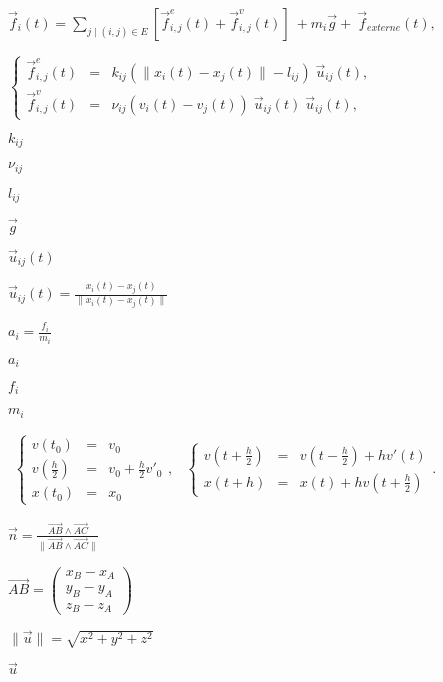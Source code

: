 \documentclass{article}
\begin{document}
$ \vec{f}_i(t) = \sum_{j\mid(i,j)\in E} \left[\vec{f}^{e}_{i,j}(t) + \vec{f}^{v}_{i,j}(t) \right] \: + m_i \vec{g} +\: \vec{f}_{externe}(t),$
\pagebreak

$ \left\{ \begin{array}{lcl} \vec{f}^{e}_{i,j}(t) &=& k_{ij} \left(\|x_i(t) - x_j(t)\| - l_{ij}\right)\; \vec{u}_{ij}(t),\\ \vec{f}^{v}_{i,j}(t) &=& {\nu}_{ij} \left(v_i(t) - v_j(t)\right) \; \vec{u}_{ij}(t) \; \vec{u}_{ij}(t), \end{array} \right. $
\pagebreak

$k_{ij}$
\pagebreak

${\nu}_{ij}$
\pagebreak

$l_{ij}$
\pagebreak

$\vec{g}$
\pagebreak

$\vec{u}_{ij}(t)$
\pagebreak

$ \vec{u}_{ij}(t) = \frac{x_i(t) - x_j(t)}{\|x_i(t) - x_j(t)\|} $
\pagebreak

$ a_i = \frac{f_i}{m_i} $
\pagebreak

$a_i$
\pagebreak

$f_i $
\pagebreak

$m_i $
\pagebreak

$ \begin{array}{lr} \left\{ \begin{array}{ccl} v(t_0) &=& v_0\\ v(\frac{h}{2}) &=& v_0 + \frac{h}{2}v'_0\\ x(t_0) &=& x_0 \end{array} \right., & \left\{ \begin{array}{ccl} v(t+\frac{h}{2}) &=& v(t-\frac{h}{2}) + hv'(t) \\ x(t+h) &=& x(t) + hv(t+\frac{h}{2}) \end{array} \right.. \end{array} $
\pagebreak

$\vec{n} = \frac{\vec{AB} \wedge \vec{AC}}{\| \vec{AB} \wedge \vec{AC} \|}$
\pagebreak

$\vec{AB} = \left( \begin{array}{c} x_B - x_A\\ y_B - y_A \\ z_B - z_A \end{array} \right) $
\pagebreak

$ \|\vec{u}\| = \sqrt{x^2 + y^2 + z^2} $
\pagebreak

$ \vec{u} $
\pagebreak
\end{document}
